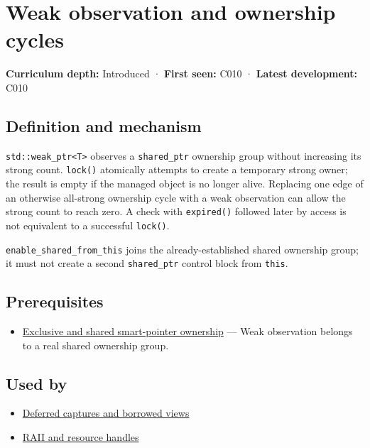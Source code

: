 \hypertarget{appendix-b9548675eb2b}{}
\section{Weak observation and ownership cycles}\label{appendix-b9548675eb2b-weak-observation-and-ownership-cycles}

\textbf{Curriculum depth:} Introduced · \textbf{First seen:} C010 · \textbf{Latest development:} C010

\subsection{Definition and mechanism}\label{appendix-b9548675eb2b-definition-and-mechanism}

\texttt{std::weak\_ptr\textless{}T\textgreater{}} observes a \texttt{shared\_ptr} ownership group without increasing its strong count. \texttt{lock()} atomically attempts to create a temporary strong owner; the result is empty if the managed object is no longer alive. Replacing one edge of an otherwise all-strong ownership cycle with a weak observation can allow the strong count to reach zero. A check with \texttt{expired()} followed later by access is not equivalent to a successful \texttt{lock()}.

\texttt{enable\_shared\_from\_this} joins the already-established shared ownership group; it must not create a second \texttt{shared\_ptr} control block from \texttt{this}.

\subsection{Prerequisites}\label{appendix-b9548675eb2b-prerequisites}

\begin{itemize}
\tightlist
\item
  \hyperref[appendix-51602cabe815]{Exclusive and shared smart-pointer ownership} --- Weak observation belongs to a real shared ownership group.
\end{itemize}

\subsection{Used by}\label{appendix-b9548675eb2b-used-by}

\begin{itemize}
\tightlist
\item
  \hyperref[appendix-aea529eb5175]{Deferred captures and borrowed views}
\item
  \hyperref[appendix-69739d3ab49b]{RAII and resource handles}
\end{itemize}

